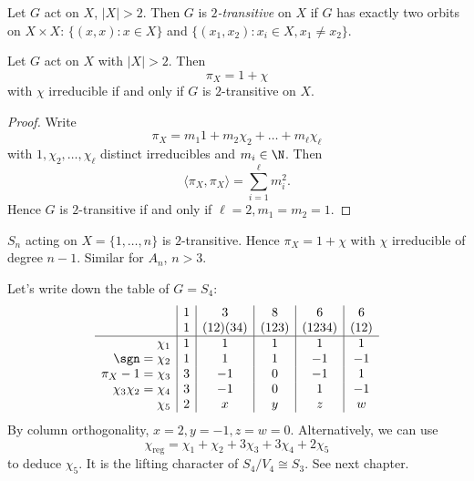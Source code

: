 \documentclass[a4paper]{article}
\begin{document}
\begin{definition}[\(2\)-transitive]
  Let \(G\) act on \(X\), \(|X| > 2\). Then \(G\) is \emph{\(2\)-transitive} on \(X\) if \(G\) has exactly two orbits on \(X \times X\): \(\{(x, x): x \in X\}\) and \(\{(x_1, x_2): x_i \in X, x_1 \neq x_2\}\).
\end{definition}

\begin{lemma}
  Let \(G\) act on \(X\) with \(|X| > 2\). Then
  \[
    \pi_X = 1 + \chi
  \]
  with \(\chi\) irreducible if and only if \(G\) is \(2\)-transitive on \(X\).
\end{lemma}

\begin{proof}
  Write
  \[
    \pi_X = m_1 1 + m_2 \chi_2 + \dots + m_\ell \chi_\ell
  \]
  with \(1, \chi_2, \dots, \chi_\ell\) distinct irreducibles and \(m_i \in \N\). Then
  \[
    \langle \pi_X, \pi_X \rangle = \sum_{i = 1}^\ell m_i^2.
  \]
  Hence \(G\) is \(2\)-transitive if and only if \(\ell = 2, m_1 = m_2 = 1\).
\end{proof}

\begin{eg}
  \(S_n\) acting on \(X = \{1, \dots, n\}\) is \(2\)-transitive. Hence \(\pi_X = 1 + \chi\) with \(\chi\) irreducible of degree \(n - 1\). Similar for \(A_n\), \(n > 3\).
\end{eg}

\begin{eg}
  Let's write down the table of \(G = S_4\):
  \[
    \begin{array}{r|c|c|c|c|c}
      & 1 & 3 & 8 & 6 & 6 \\
      & 1 & (12)(34) & (123) & (1234) & (12) \\ \hline
      \chi_1 & 1 & 1 & 1 & 1 & 1 \\
      \sgn = \chi_2 & 1 & 1 & 1 & -1 & -1  \\
      \pi_X - 1 = \chi_3 & 3 & -1 & 0 & -1 & 1 \\
      \chi_3 \chi_2 = \chi_4 & 3 & -1 & 0 & 1 & -1 \\
      \chi_5 & 2 & x & y & z & w
    \end{array}
  \]
  By column orthogonality, \(x = 2, y = -1, z = w = 0\). Alternatively, we can use
  \[
    \chi_{\text{reg}} = \chi_1 + \chi_2 + 3 \chi_3 + 3 \chi_4 + 2 \chi_5
  \]
  to deduce \(\chi_5\). It is the lifting character of \(S_4/V_4 \cong S_3\). See next chapter.
\end{eg}
\end{document}
